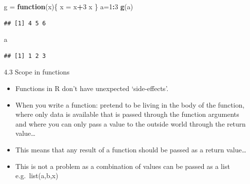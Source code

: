 \documentclass[
  ignorenonframetext,
]{beamer}
\newenvironment{Shaded}{\begin{snugshade}}{\end{snugshade}}
\newcommand{\ControlFlowTok}[1]{\textcolor[rgb]{0.13,0.29,0.53}{\textbf{#1}}}
\newcommand{\DecValTok}[1]{\textcolor[rgb]{0.00,0.00,0.81}{#1}}
\newcommand{\FunctionTok}[1]{\textcolor[rgb]{0.13,0.29,0.53}{\textbf{#1}}}
\newcommand{\NormalTok}[1]{#1}
\newcommand{\OtherTok}[1]{\textcolor[rgb]{0.56,0.35,0.01}{#1}}
\newcommand{\SpecialCharTok}[1]{\textcolor[rgb]{0.81,0.36,0.00}{\textbf{#1}}}
\begin{document}
\begin{frame}[fragile]
\begin{Shaded}
\begin{Highlighting}[]
\NormalTok{g }\OtherTok{=} \ControlFlowTok{function}\NormalTok{(x)\{}
\NormalTok{  x }\OtherTok{=}\NormalTok{ x}\SpecialCharTok{+}\DecValTok{3}
\NormalTok{  x}
\NormalTok{\}}
\NormalTok{a}\OtherTok{=}\DecValTok{1}\SpecialCharTok{:}\DecValTok{3}
\FunctionTok{g}\NormalTok{(a)}
\end{Highlighting}
\end{Shaded}

\begin{verbatim}
## [1] 4 5 6
\end{verbatim}

\begin{Shaded}
\begin{Highlighting}[]
\NormalTok{a}
\end{Highlighting}
\end{Shaded}

\begin{verbatim}
## [1] 1 2 3
\end{verbatim}
\end{frame}

\begin{frame}{4.3 Scope in functions}
\protect\hypertarget{scope-in-functions-1}{}
\begin{itemize}
\item
  Functions in R don't have unexpected `side-effects'.
\item
  When you write a function: pretend to be living in the body of the
  function, where only data is available that is passed through the
  function arguments and where you can only pass a value to the outside
  world through the return value\ldots{}
\item
  This means that any result of a function should be passed as a return
  value\ldots{}
\item
  This is not a problem as a combination of values can be passed as a
  list e.g.~list(a,b,x)
\end{itemize}
\end{frame}
\end{document}
